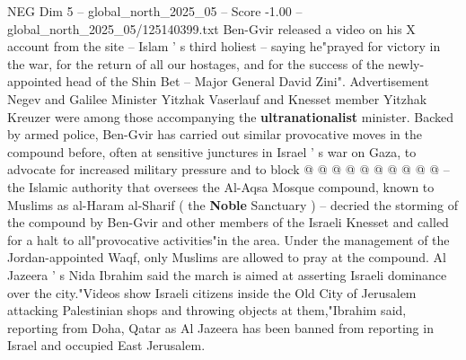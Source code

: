 \begin{textsample}{NEG Dim 5 – global\_north\_2025\_05 – Score -1.00 – global\_north\_2025\_05/125140399.txt}
Ben-Gvir released a video on his X account from the site -- Islam ' s third holiest -- saying he"prayed for victory in the war, for the return of all our hostages, and for the success of the newly-appointed head of the Shin Bet -- Major General David Zini".
Advertisement Negev and Galilee Minister Yitzhak Vaserlauf and Knesset member Yitzhak Kreuzer were among those accompanying the \textbf{ultranationalist} minister.
Backed by armed police, Ben-Gvir has carried out similar provocative moves in the compound before, often at sensitive junctures in Israel ' s war on Gaza, to advocate for increased military pressure and to block @ @ @ @ @ @ @ @ @ @ -- the Islamic authority that oversees the Al-Aqsa Mosque compound, known to Muslims as al-Haram al-Sharif ( the \textbf{Noble} Sanctuary ) -- decried the storming of the compound by Ben-Gvir and other members of the Israeli Knesset and called for a halt to all"provocative activities"in the area.
Under the management of the Jordan-appointed Waqf, only Muslims are allowed to pray at the compound.
Al Jazeera ' s Nida Ibrahim said the march is aimed at asserting Israeli dominance over the city."Videos show Israeli citizens inside the Old City of Jerusalem attacking Palestinian shops and throwing objects at them,"Ibrahim said, reporting from Doha, Qatar as Al Jazeera has been banned from reporting in Israel and occupied East Jerusalem.

\end{textsample}
